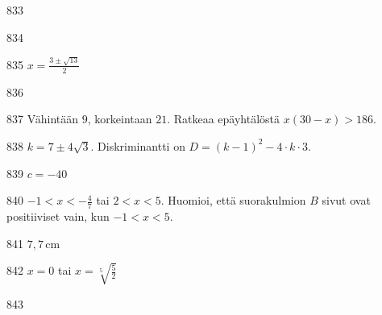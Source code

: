\begin{Vastaus}{833}
    
\end{Vastaus}
\begin{Vastaus}{834}
    
\end{Vastaus}
\begin{Vastaus}{835}
    $x =\frac{3 \pm \sqrt{13}}{2}$
    
\end{Vastaus}
\begin{Vastaus}{836}
    
\end{Vastaus}
\begin{Vastaus}{837}
	Vähintään $9$, korkeintaan $21$. Ratkeaa epäyhtälöstä $x(30-x)>186$.
	
\end{Vastaus}
\begin{Vastaus}{838}
		$k = 7 \pm 4 \sqrt{3}$. Diskriminantti on $D = (k-1)^2-4\cdot k \cdot 3$.
    
\end{Vastaus}
\begin{Vastaus}{839}
		$c=-40$
    
\end{Vastaus}
\begin{Vastaus}{840}
	$-1 < x < -\frac{4}{7}$ tai $2 < x < 5$. Huomioi, että suorakulmion $B$
    sivut ovat positiiviset vain, kun $-1<x<5$.
    
\end{Vastaus}
\begin{Vastaus}{841}
     $7,7$\,cm
    
\end{Vastaus}
\begin{Vastaus}{842}
		$x=0$ tai $x=\sqrt[5]{\frac{5}{2}}$
    
\end{Vastaus}
\begin{Vastaus}{843}
    
\end{Vastaus}
